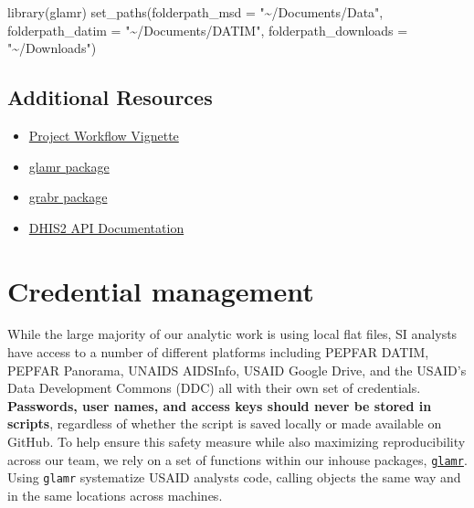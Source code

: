 \documentclass[
  letterpaper,
  DIV=11,
  numbers=noendperiod]{scrreprt}
\newenvironment{Shaded}{\begin{snugshade}}{\end{snugshade}}
\newcommand{\AttributeTok}[1]{\textcolor[rgb]{0.40,0.45,0.13}{#1}}
\newcommand{\FunctionTok}[1]{\textcolor[rgb]{0.28,0.35,0.67}{#1}}
\newcommand{\NormalTok}[1]{\textcolor[rgb]{0.00,0.23,0.31}{#1}}
\newcommand{\StringTok}[1]{\textcolor[rgb]{0.13,0.47,0.30}{#1}}
\providecommand{\tightlist}{%
  \setlength{\itemsep}{0pt}\setlength{\parskip}{0pt}}\usepackage{longtable,booktabs,array}
\begin{document}
\begin{Shaded}
\begin{Highlighting}[]
\FunctionTok{library}\NormalTok{(glamr)}
\FunctionTok{set\_paths}\NormalTok{(}\AttributeTok{folderpath\_msd =} \StringTok{"\textasciitilde{}/Documents/Data"}\NormalTok{,}
  \AttributeTok{folderpath\_datim =}  \StringTok{"\textasciitilde{}/Documents/DATIM"}\NormalTok{,}
  \AttributeTok{folderpath\_downloads =}  \StringTok{"\textasciitilde{}/Downloads"}\NormalTok{)}
\end{Highlighting}
\end{Shaded}

\hypertarget{additional-resources-3}{%
\section{Additional Resources}\label{additional-resources-3}}

\begin{itemize}
\tightlist
\item
  \href{https://usaid-oha-si.github.io/glamr/articles/project-workflow.html}{Project
  Workflow Vignette}
\item
  \href{https://usaid-oha-si.github.io/glamr/}{glamr package}
\item
  \href{https://usaid-oha-si.github.io/grabr/}{grabr package}
\item
  \href{https://docs.dhis2.org/en/develop/using-the-api/dhis-core-version-240/introduction.html}{DHIS2
  API Documentation}
\end{itemize}


\hypertarget{credential-management}{%
\chapter{Credential management}\label{credential-management}}

While the large majority of our analytic work is using local flat files,
SI analysts have access to a number of different platforms including
PEPFAR DATIM, PEPFAR Panorama, UNAIDS AIDSInfo, USAID Google Drive, and
the USAID's Data Development Commons (DDC) all with their own set of
credentials. \textbf{Passwords, user names, and access keys should never
be stored in scripts}, regardless of whether the script is saved locally
or made available on GitHub. To help ensure this safety measure while
also maximizing reproducibility across our team, we rely on a set of
functions within our inhouse packages,
\href{https://usaid-oha-si.github.io/glamr/}{\texttt{glamr}}. Using
\texttt{glamr} systematize USAID analysts code, calling objects the same
way and in the same locations across machines.
\end{document}
